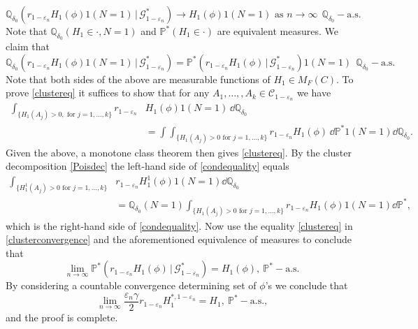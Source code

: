 \documentclass[12pt]{article}
\makeatletter
\renewenvironment{proof}[1][\proofname]{%
\par\pushQED{\qed}\normalfont%
\topsep6\p@\@plus6\p@\relax
\trivlist\item[\hskip\labelsep\bfseries#1\@addpunct{.}]%
\ignorespaces
}{%
\popQED\endtrivlist\@endpefalse
}
\numberwithin{theorem}{section}
\theoremstyle{def}
\numberwithin{equation}{section}
\renewcommand{\P}{\mathbb{P}}
\newcommand{\Q}{\mathbb{Q}}
\newcommand{\cC}{\mathcal C}
\newcommand{\cG}{\mathcal G}
\newcommand{\veps}{\varepsilon}
\makeatother
\begin{document}
{\begin{proof}
\begin{equation}\label{clusterconvergence}
\Q_{\delta_0}(r_{1-\veps_n}H_1(\phi)1(N=1)\, | \, \cG^*_{1-\veps_n})\to H_1(\phi)1(N=1)\text{ as }n\to\infty\ \ \Q_{\delta_0}-\text{a.s.}
\end{equation}
Note that $\Q_{\delta_0}(H_1\in\cdot, N=1)$ and $\P^*(H_1\in\cdot)$ are equivalent measures.  
We claim that 
\begin{equation}\label{clustereq}\Q_{\delta_0}(r_{1-\veps_n}H_1(\phi)1(N=1) \, |\, \cG^*_{1-\veps_n})=\P^*(r_{1-\veps_n}H_1(\phi) \, | \, \cG^*_{1-\veps_n})1(N=1)\ \ \Q_{\delta_0}-\text{a.s.}
\end{equation}
Note that both sides of the above are measurable functions of $H_1\in M_F(C)$.
To prove \eqref{clustereq} it suffices to show that for any $A_1,\dots,,A_k\in\cC_{1-\veps_n}$ %
we have 
\begin{align}\label{condequality}
\int_{\{H_1(A_j)>0, \text{ for }j=1,\dots,k\}}r_{1-\veps_n}&H_1(\phi)1(N=1)\,\dd \Q_{\delta_0}\\
\nonumber&=\int \int_{\{H_1(A_j)>0\text{ for }j=1,\dots,k\}}r_{1-\veps_n}H_1(\phi)\,\dd \P^*1(N=1)\dd \Q_{\delta_0}.
\end{align}
Given the above, a monotone class theorem then gives \eqref{clustereq}. 
By the cluster decomposition \eqref{Poisdec} the left-hand side of \eqref{condequality} equals
\begin{align*}\int_{\{H^1_1(A_j)>0\text{ for }j=1,\dots,k\}}&r_{1-\veps_n}H_1^1(\phi)1(N=1)\dd \Q_{\delta_0}\\
&=\Q_{\delta_0}(N=1)\int_{\{H_1(A_j)>0\text{ for }j=1,\dots,k\}}r_{1-\veps_n}H_1(\phi)1(N=1)\dd \P^*,
\end{align*}
which is the right-hand side of \eqref{condequality}. Now use the equality \eqref{clustereq} in \eqref{clusterconvergence} and the aforementioned equivalence of measures to conclude that
\[\lim_{n\to\infty}\P^*(r_{1-\veps_n}H_1(\phi) \, | \, \cG^*_{1-\veps_n})= H_1(\phi), \ \P^*-\text{a.s.}\]
By considering a countable convergence determining set of $\phi$'s we conclude that 
\[\lim_{n\to\infty}\frac{\veps_n\gamma}{2}r_{1-\veps_n}H^{*,1-\veps_n}_{1}=H_1, \ \P^*-\text{a.s.,}\]
and the proof is complete.
\end{proof}


}
\end{document}
